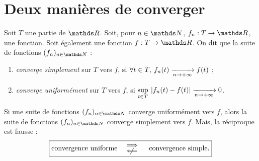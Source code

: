 \section{Deux manières de converger}

\begin{defn}
	Soit $T$\/ une partie de $\R$. Soit, pour $n \in \N$, $f_n : T \to \R$, une fonction. Soit également une fonction $f : T \to \R$. On dit que la suite de fonctions $(f_n)_{n \in \N}$\/ :
	\begin{enumerate}
		\item {\it converge simplement}\/ sur $T$\/ vers $f$, si \hfill$\displaystyle\forall t \in T,\:f_n(t)\xrightarrow[n\to +\infty]{} f(t)$\/ ;\hfill\null
		\item {\it converge uniformément}\/ sur $T$\/ vers $f$, si \hfill$\displaystyle\sup_{t \in T}\: {|f_n(t) - f(t)|} \xrightarrow[n\to +\infty]{} 0$.\hfill\null
	\end{enumerate}
\end{defn}

Si une suite de fonctions $(f_n)_{n\in\N}$\/ converge uniformément vers $f$, alors la suite de fonctions $(f_n)_{n\in\N}$\/ converge simplement vers $f$. {\color{red}Mais, la réciproque est fausse} : \[
	\boxed{\text{convergence uniforme}\quad\substack{\\\ds\implies\\\ds\centernot\impliedby} \quad \text{ convergence simple}.}
\]

